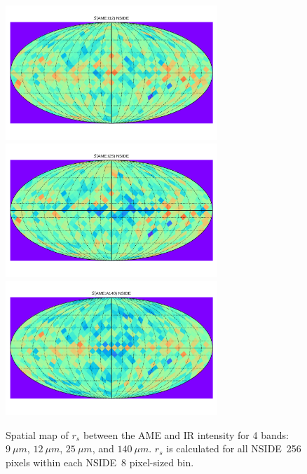 \begin{figure}
        \includegraphics[width=80mm]{../Plots/Allsky_Corr/RadNorm/Spearman_Map_nside8_AMEtoI12.pdf}
        \includegraphics[width=80mm]{../Plots/Allsky_Corr/RadNorm/Spearman_Map_nside8_AMEtoI25.pdf}
        \includegraphics[width=80mm]{../Plots/Allsky_Corr/RadNorm/Spearman_Map_nside8_AMEtoA140.pdf}
        \centering
        \caption{Spatial map of $r_{s}$ between the AME and IR intensity for 4 bands:$9~\mu{}m$, $12~\mu{}m$, $25~\mu{}m$, and $140~\mu{}m$. $r_{s}$ is calculated for all NSIDE~256 pixels within each NSIDE~8 pixel-sized bin.}
      \end{figure}
